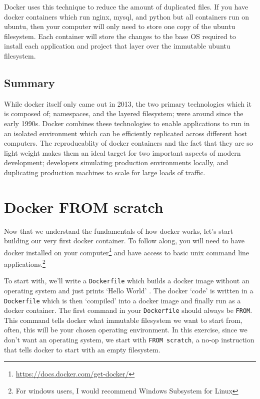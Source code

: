 \documentclass{csse4400}
\begin{document}
Docker uses this technique to reduce the amount of duplicated files.
If you have docker containers which run nginx, mysql, and python but all containers run on ubuntu,
then your computer will only need to store one copy of the ubuntu filesystem.
Each container will store the changes to the base OS required to install each application and project that layer over the immutable ubuntu filesystem.

\subsection{Summary}
While docker itself only came out in 2013, the two primary technologies which it is composed of; namespaces, and the layered filesystem;
were around since the early 1990s.
Docker combines these technologies to enable applications to run in an isolated environment which can be efficiently replicated across different host computers.
The reproducablity of docker containers and the fact that they are so light weight makes them an ideal target for two important aspects of modern development;
developers simulating production environments locally, and duplicating production machines to scale for large loads of traffic.


\section{Docker FROM scratch}
Now that we understand the fundamentals of how docker works, let's start building our very first docker container.
To follow along, you will need to have docker installed on your
computer\footnote{\url{https://docs.docker.com/get-docker/}} and have access to basic unix command line
applications.\footnote{For windows users, I would recommend Windows Subsystem for Linux}

To start with, we'll write a \texttt{Dockerfile} which builds a docker image without an operating system and just prints `Hello World'
\cite{docker-from-scratch}.
The docker `code' is written in a \texttt{Dockerfile} which is then `compiled' into a docker image and finally run as a docker container.
The first command in your \texttt{Dockerfile} should always be \texttt{FROM}.
This command tells docker what immutable filesystem we want to start from, often, this will be your chosen operating environment.
In this exercise, since we don't want an operating system, we start with \texttt{FROM scratch},
a no-op instruction that tells docker to start with an empty filesystem.
\end{document}
